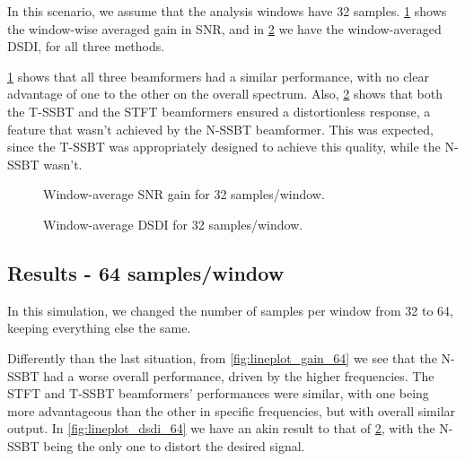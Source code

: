 In this scenario, we assume that the analysis windows have 32 samples. \cref{fig:lineplot_gain_32} shows the window-wise averaged gain in SNR, and in \cref{fig:lineplot_dsdi_32} we have the window-averaged DSDI, for all three methods.

\cref{fig:lineplot_gain_32} shows that all three beamformers had a similar performance, with no clear advantage of one to the other on the overall spectrum. Also, \cref{fig:lineplot_dsdi_32} shows that both the T-SSBT and the STFT beamformers ensured a distortionless response, a feature that wasn't achieved by the N-SSBT beamformer. This was expected, since the T-SSBT was appropriately designed to achieve this quality, while the N-SSBT wasn't.



%	
%	
%
\begin{figure}[H]
\centering

\caption{Window-average SNR gain for 32 samples/window.}
\label{fig:lineplot_gain_32}
\end{figure}

\begin{figure}[H]
	\centering
	
	\caption{Window-average DSDI for 32 samples/window.}
	\label{fig:lineplot_dsdi_32}
\end{figure}
%
\subsection{Results - 64 samples/window}

In this simulation, we changed the number of samples per window from 32 to 64, keeping everything else the same. 

Differently than the last situation, from \cref{fig:lineplot_gain_64} we see that the N-SSBT had a worse overall performance, driven by the higher frequencies. The STFT and T-SSBT beamformers' performances were similar, with one being more advantageous than the other in specific frequencies, but with overall similar output. In \cref{fig:lineplot_dsdi_64} we have an akin result to that of \cref{fig:lineplot_dsdi_32}, with the N-SSBT being the only one to distort the desired signal.

